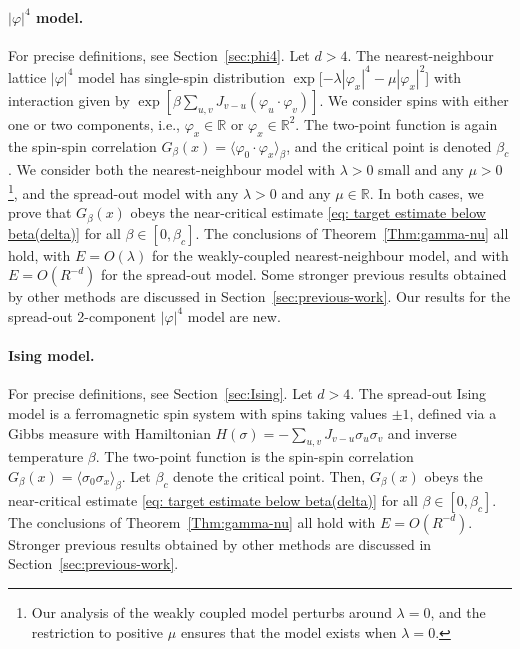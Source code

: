 \documentclass[11pt,a4paper]{article}
\numberwithin{equation}{section}
\theoremstyle{plain}
\theoremstyle{definition}
\newcommand\1{\mathds{1}}
\begin{document}
\paragraph{$|\varphi|^4$ model.}
For precise definitions, see Section~\ref{sec:phi4}.  Let $d>4$.
The nearest-neighbour lattice $|\varphi|^4$ model
has single-spin distribution
$\exp[-\lambda |\varphi_x|^4 - \mu|\varphi_x|^2$] with interaction
given by
$\exp[\beta\sum_{u,v}J_{v-u}(\varphi_u\cdot \varphi_v)]$.  We consider
spins with either one or two components, i.e., $\varphi_x\in \mathbb R$
or $\varphi_x\in \mathbb{R}^2$.
The two-point function is again the spin-spin correlation
$G_\beta(x)=\langle \varphi_0\cdot\varphi_x \rangle_\beta$, and the critical point
is denoted $\beta_c$.
We consider both the nearest-neighbour model with $\lambda>0$ small and any $\mu>0$\footnote{Our analysis of the weakly coupled model perturbs around $\lambda=0$,
and the restriction to positive $\mu$ ensures that the model exists when $\lambda=0$.},
and the spread-out model with any $\lambda>0$ and any $\mu\in \mathbb R$.
In both cases, we prove that
$G_\beta(x)$ obeys the near-critical
estimate \eqref{eq: target estimate below beta(delta)} for all $\beta \in [0,\beta_c]$.
The conclusions of Theorem~\ref{Thm:gamma-nu} all hold, with $E=O(\lambda)$
for the weakly-coupled nearest-neighbour model, and with $E=O(R^{-d})$ for the spread-out
model.
Some stronger previous results obtained by other methods are discussed in
Section~\ref{sec:previous-work}. Our results for the spread-out 2-component
$|\varphi|^4$ model are new.

\paragraph{Ising model.}
For precise definitions, see Section~\ref{sec:Ising}. Let $d>4$.
The spread-out Ising model is a ferromagnetic spin system with spins
taking values $\pm 1$, defined via a Gibbs measure with Hamiltonian
$H(\sigma) = -\sum_{u,v} J_{v-u} \sigma_u \sigma_v$ and inverse
temperature $\beta$.
The two-point function is the spin-spin correlation $G_\beta(x) = \langle \sigma_0
\sigma_x\rangle_\beta$.
Let $\beta_c$ denote
the critical point.  Then, $G_\beta(x)$ obeys the near-critical
estimate \eqref{eq: target estimate below beta(delta)} for all $\beta \in [0,\beta_c]$.
The conclusions of Theorem~\ref{Thm:gamma-nu} all hold with $E=O(R^{-d})$.
Stronger previous results obtained by other methods are discussed in
Section~\ref{sec:previous-work}.
\end{document}
